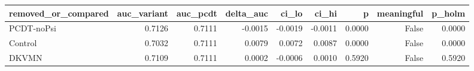 \begin{tabular}{lrrrrrrrr}
\toprule
removed\_or\_compared & auc\_variant & auc\_pcdt & delta\_auc & ci\_lo & ci\_hi & p & meaningful & p\_holm \\
\midrule
PCDT-noPsi & 0.7126 & 0.7111 & -0.0015 & -0.0019 & -0.0011 & 0.0000 & False & 0.0000 \\
Control & 0.7032 & 0.7111 & 0.0079 & 0.0072 & 0.0087 & 0.0000 & False & 0.0000 \\
DKVMN & 0.7109 & 0.7111 & 0.0002 & -0.0006 & 0.0010 & 0.5920 & False & 0.5920 \\
\bottomrule
\end{tabular}
